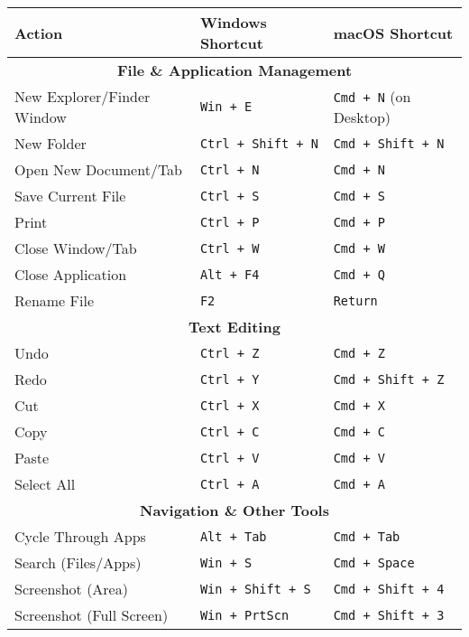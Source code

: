 \documentclass[11pt,a4paper]{report}
\newcommand{\bfb}[1]{{\bf \color{blue} #1}}
\begin{document}
\begin{longtable}{|p{}|p{}|p{}|}
\hline
{\bf Action} & {\bf Windows Shortcut} & {\bf macOS Shortcut}  \\
\hline
\endhead
\multicolumn{3}{|c|}{\bfb{File \& Application Management}} \\
\hline
New Explorer/Finder Window & \verb|Win + E| & \verb|Cmd + N| (on Desktop) \\

New Folder & \verb|Ctrl + Shift + N| & \verb|Cmd + Shift + N| \\
Open New Document/Tab & \verb|Ctrl + N| & \verb|Cmd + N| \\
Save Current File & \verb|Ctrl + S| & \verb|Cmd + S| \\
Print & \verb|Ctrl + P| & \verb|Cmd + P| \\

Close Window/Tab & \verb|Ctrl + W| & \verb|Cmd + W| \\

Close Application & \verb|Alt + F4| & \verb|Cmd + Q| \\
Rename File & \verb|F2| & \verb|Return| \\

\hline
\multicolumn{3}{|c|}{\bfb{Text Editing}} \\
\hline
Undo & \verb|Ctrl + Z| & \verb|Cmd + Z| \\

Redo & \verb|Ctrl + Y| & \verb|Cmd + Shift + Z| \\
Cut & \verb|Ctrl + X| & \verb|Cmd + X| \\

Copy & \verb|Ctrl + C| & \verb|Cmd + C| \\
Paste & \verb|Ctrl + V| & \verb|Cmd + V| \\
Select All & \verb|Ctrl + A| & \verb|Cmd + A| \\

\hline
\multicolumn{3}{|c|}{\bfb{Navigation \& Other Tools}} \\
\hline
Cycle Through Apps & \verb|Alt + Tab| & \verb|Cmd + Tab| \\

Search (Files/Apps) & \verb|Win + S| & \verb|Cmd + Space| \\
Screenshot (Area) & \verb|Win + Shift + S| & \verb|Cmd + Shift + 4| \\
Screenshot (Full Screen) & \verb|Win + PrtScn| & \verb|Cmd + Shift + 3| \\
\hline

\end{longtable}
\end{document}
